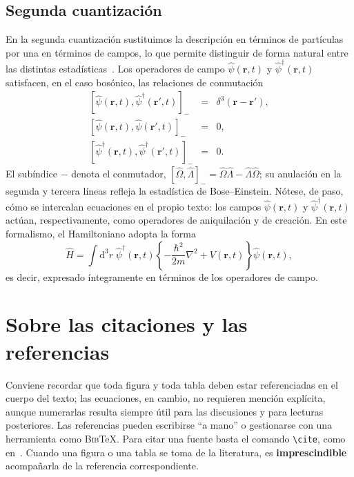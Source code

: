 \documentclass[11pt,letterpaper]{article}
\newcommand{\dd}{\mathrm{d}}          %
\newcommand{\vc}[1]{\bm{#1}}          %
\newcommand{\op}[1]{\hat{#1}}         %
\begin{document}
\subsection{Segunda cuantización}\label{subsec:segundacuantizacion}

En la segunda cuantización sustituimos la descripción en términos de partículas por
una en términos de campos, lo que permite distinguir de forma natural entre las
distintas estadísticas~\cite{Pauli-pr58}. Los operadores de campo
$\op{\psi}(\vc{r},t)$ y $\op{\psi}^{\dagger}(\vc{r},t)$ satisfacen, en el caso
bosónico, las relaciones de conmutación
\begin{eqnarray}
  \left[\op{\psi}(\vc{r},t),\op{\psi}^{\dagger}(\vc{r}',t)\right]_{-}
    & = & \delta^{3}(\vc{r}-\vc{r}'), \nonumber \\
  \left[\op{\psi}(\vc{r},t),\op{\psi}(\vc{r}',t)\right]_{-}
    & = & 0, \label{eq:conmutacion} \\
  \left[\op{\psi}^{\dagger}(\vc{r},t),\op{\psi}^{\dagger}(\vc{r}',t)\right]_{-}
    & = & 0. \nonumber
\end{eqnarray}
El subíndice $-$ denota el conmutador,
$[\op{\Omega},\op{\Lambda}]_{-} = \op{\Omega}\op{\Lambda} - \op{\Lambda}\op{\Omega}$;
su anulación en la segunda y tercera líneas refleja la estadística de Bose–Einstein.
Nótese, de paso, cómo se intercalan ecuaciones en el propio texto: los campos
$\op{\psi}(\vc{r},t)$ y $\op{\psi}^{\dagger}(\vc{r},t)$ actúan, respectivamente, como
operadores de aniquilación y de creación. En este formalismo, el Hamiltoniano adopta
la forma
\begin{equation}
  \op{H} = \int \dd^{3}r\;\op{\psi}^{\dagger}(\vc{r},t)
  \left\{ -\frac{\hbar^{2}}{2m}\nabla^{2} + V(\vc{r},t) \right\}
  \op{\psi}(\vc{r},t),
  \label{eq:hamiltoniano}
\end{equation}
es decir, expresado íntegramente en términos de los operadores de campo.

\section{Sobre las citaciones y las referencias}\label{sec:citas}

Conviene recordar que toda figura y toda tabla deben estar referenciadas en el cuerpo
del texto; las ecuaciones, en cambio, no requieren mención explícita, aunque
numerarlas resulta siempre útil para las discusiones y para lecturas posteriores. Las
referencias pueden escribirse ``a mano'' o gestionarse con una herramienta como
\textsc{Bib}\TeX{}. Para citar una fuente basta el comando \texttt{\textbackslash cite},
como en~\cite{Pauli-pr58,Shankar-book1994}. Cuando una figura o una tabla se toma de la
literatura, es \textbf{imprescindible} acompañarla de la referencia correspondiente.
\end{document}
